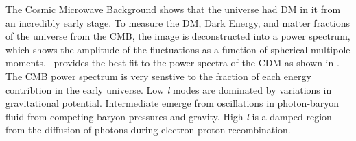 \begin{figure}[ht]
\end{figure}

The Cosmic Microwave Background shows that the universe had DM in it from an incredibly early stage.
To measure the DM, Dark Energy, and matter fractions of the universe from the CMB, the image is deconstructed into a power spectrum, which shows the amplitude of the fluctuations as a function of spherical multipole moments.
\lcdm~provides the best fit to the power spectra of the CDM as shown in .
The CMB power spectrum is very senstive to the fraction of each energy contribtion in the early universe.
Low \textit{l} modes are dominated by variations in gravitational potential.
Intermediate  emerge from oscillations in photon-baryon fluid from competing baryon pressures and gravity.
High \textit{l} is a damped region from the diffusion of photons during electron-proton recombination. \cite{Greene:cosmology_dm}

